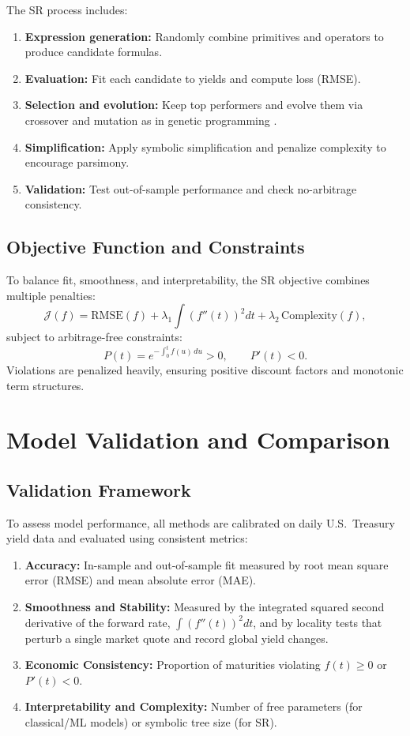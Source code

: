 \documentclass[12pt]{report}
\begin{document}
The SR process includes:
\begin{enumerate}
  \item \textbf{Expression generation:} Randomly combine primitives and operators to produce candidate formulas.
  \item \textbf{Evaluation:} Fit each candidate to yields and compute loss (RMSE).
  \item \textbf{Selection and evolution:} Keep top performers and evolve them via crossover and mutation as in genetic programming \parencite{Koza1992}.
  \item \textbf{Simplification:} Apply symbolic simplification and penalize complexity to encourage parsimony.
  \item \textbf{Validation:} Test out-of-sample performance and check no-arbitrage consistency.
\end{enumerate}

\subsection{Objective Function and Constraints}

To balance fit, smoothness, and interpretability, the SR objective combines multiple penalties:
\[
\mathcal{J}(f)=
\mathrm{RMSE}(f)
+\lambda_1\int (f''(t))^2dt
+\lambda_2\,\mathrm{Complexity}(f),
\]
subject to arbitrage-free constraints:
\[
P(t)=e^{-\int_0^t f(u)\,du}>0, \qquad P'(t)<0.
\]
Violations are penalized heavily, ensuring positive discount factors and monotonic term structures.

\section{Model Validation and Comparison}

\subsection{Validation Framework}

To assess model performance, all methods are calibrated on daily U.S.~Treasury yield data and evaluated using consistent metrics:  
\begin{enumerate}
  \item \textbf{Accuracy:} In-sample and out-of-sample fit measured by root mean square error (RMSE) and mean absolute error (MAE).
  \item \textbf{Smoothness and Stability:} Measured by the integrated squared second derivative of the forward rate,
  \(\int (f''(t))^2dt\), and by locality tests that perturb a single market quote and record global yield changes.
  \item \textbf{Economic Consistency:} Proportion of maturities violating \(f(t)\ge0\) or \(P'(t)<0\).
  \item \textbf{Interpretability and Complexity:} Number of free parameters (for classical/ML models) or symbolic tree size (for SR).
\end{enumerate}
\end{document}
